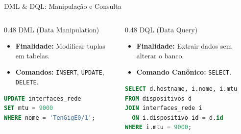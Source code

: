 \begin{frame}[fragile]{DML \& DQL: Manipulação e Consulta}
  \vspace{-0.2cm}
  \begin{columns}[t]
    \begin{column}{0.48\textwidth}
      \alert{DML (Data Manipulation)}\par
      \vspace{0.05cm}
      \begin{itemize}\setlength{\itemsep}{2pt}
        \item \textbf{Finalidade:} Modificar tuplas em tabelas.
        \item \textbf{Comandos:} \texttt{INSERT}, \texttt{UPDATE}, \texttt{DELETE}.
      \end{itemize}
      \vspace{0.05cm}
\begin{lstlisting}[language=SQL,basicstyle=\ttfamily\tiny]
UPDATE interfaces_rede 
SET mtu = 9000 
WHERE nome = 'TenGigE0/1';
\end{lstlisting}
    \end{column}

    \begin{column}{0.48\textwidth}
      \alert{DQL (Data Query)}\par
      \vspace{0.05cm}
      \begin{itemize}\setlength{\itemsep}{2pt}
        \item \textbf{Finalidade:} Extrair dados sem alterar o banco.
        \item \textbf{Comando Canônico:} \texttt{SELECT}.
      \end{itemize}
      \vspace{0.05cm}
\begin{lstlisting}[language=SQL,basicstyle=\ttfamily\tiny]
SELECT d.hostname, i.nome, i.mtu
FROM dispositivos d
JOIN interfaces_rede i 
  ON i.dispositivo_id = d.id
WHERE i.mtu = 9000;
\end{lstlisting}
    \end{column}
  \end{columns}
\end{frame}

